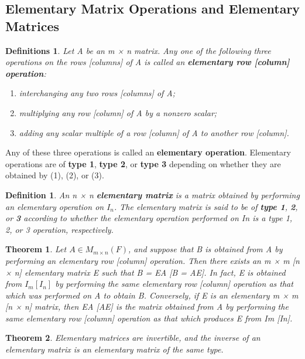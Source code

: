 \documentclass{article}
\newcommand{\bd}[1]{\textbf{#1}}
\theoremstyle{plain}
\newtheorem{theorem}{Theorem}[section]
\newtheorem*{definition1}{Definition}
\newtheorem*{definitions}{Definitions}
\theoremstyle{plain} %
\begin{document}
\subsection{Elementary Matrix Operations and Elementary Matrices}

\begin{definitions}
Let A be an m × n matrix. Any one of the following three operations on the rows [columns] of A is called an \bd{elementary row [column] operation}:
\begin{enumerate}[label=(\arabic*)]
  \item interchanging any two rows [columns] of A;
  \item multiplying any row [column] of A by a nonzero scalar;
  \item adding any scalar multiple of a row [column] of A to another row [column].
\end{enumerate}
\end{definitions}

Any of these three operations is called an \bd{elementary operation}. Elementary operations are of \bd{type 1}, \bd{type 2}, or \bd{type 3} depending on whether they are obtained by (1), (2), or (3).

\begin{definition1}
  An n × n \bd{elementary matrix} is a matrix obtained by performing an elementary operation on $I_n$. The elementary matrix is said to be of \bd{type 1}, \bd{2}, or \bd{3} according to whether the elementary operation performed on In is a type 1, 2, or 3 operation, respectively.
\end{definition1}

\begin{theorem}
  Let $A \in M_{m\times n}(F)$, and suppose that B is obtained from A by performing an elementary row [column] operation. Then there exists an m × m [n × n] elementary matrix E such that B = EA [B = AE]. In fact, E is obtained from $I_m [I_n]$ by performing the same elementary row [column] operation as that which was performed on A to obtain B. Conversely, if E is an elementary m × m [n × n] matrix, then EA [AE] is the matrix obtained from A by performing the same elementary row [column] operation as that which produces E from Im [In].
\end{theorem}

\begin{theorem}
  Elementary matrices are invertible, and the inverse of an elementary matrix is an elementary matrix of the same type.
\end{theorem}
\end{document}
